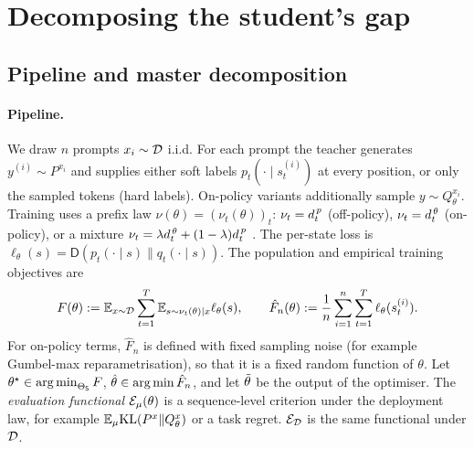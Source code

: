 \section{Decomposing the student's gap}\label{sec:decomposition}

\subsection{Pipeline and master decomposition}

\paragraph{Pipeline.}
We draw $n$ prompts $x_i\sim\mathcal{D}$ i.i.d. For each prompt the teacher generates $y^{(i)}\sim P^{x_i}$ and
supplies either soft labels $p_t(\cdot\mid s^{(i)}_t)$ at every position, or only the sampled tokens (hard
labels). On-policy variants additionally sample $y\sim Q^{x_i}_\theta$. Training uses a prefix law
$\nu(\theta)=(\nu_t(\theta))_t$: $\nu_t=d^{\,p}_{t}$ (off-policy), $\nu_t=d^{\,\theta}_{t}$ (on-policy), or a mixture
$\nu_t=\lambda d^{\,\theta}_{t}+(1-\lambda)d^{\,p}_{t}$ \citep{agarwal2024gkd}. The per-state loss is
$\ell_\theta(s)=\mathsf D(p_t(\cdot\mid s)\|q_t(\cdot\mid s))$. The population and empirical training
objectives are
\[
F(\theta):=\mathbb{E}_{x\sim\mathcal{D}}\sum_{t=1}^T\mathbb{E}_{s\sim\nu_t(\theta)\mid x}\ell_\theta(s),\qquad
\hat F_n(\theta):=\frac1n\sum_{i=1}^n\sum_{t=1}^T\ell_\theta(s^{(i)}_t).
\]
For on-policy terms, $\hat F_n$ is defined with fixed sampling noise (for example Gumbel-max
reparametrisation), so that it is a fixed random function of $\theta$. Let
$\theta^\star\in\operatorname*{arg\,min}_{\Theta_{\mathsf{S}}}F$, $\hat\theta\in\operatorname*{arg\,min}\hat F_n$, and let $\tilde\theta$ be the output of the
optimiser. The \emph{evaluation functional} $\mathcal{E}_\mu(\theta)$ is a sequence-level criterion under the
deployment law, for example $\mathbb{E}_\mu\mathrm{KL}(P^{x}\|Q^{x}_{\theta})$ or a task regret. $\mathcal{E}_{\mathcal{D}}$ is the same functional
under $\mathcal{D}$.

